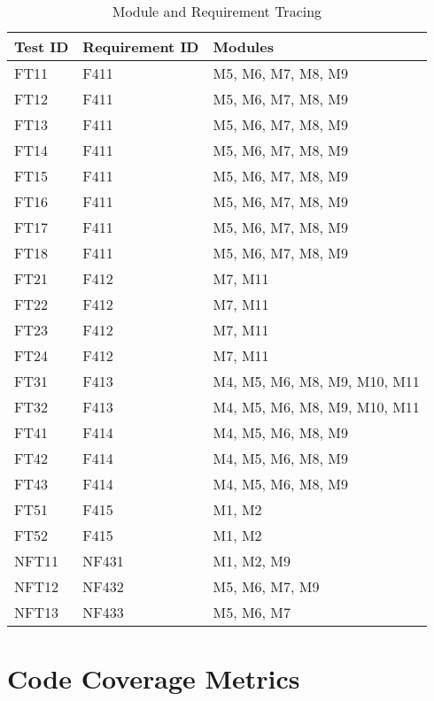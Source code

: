 \documentclass[12pt, titlepage]{article}
\begin{document}
\begin{table}[]

  \centering
  \caption{Module and Requirement Tracing}
  \begin{tabular}{|l|l|l|}
  \hline
  \textbf{Test ID} & \textbf{Requirement ID} & \textbf{Modules}\\
  \hline
  FT11 & F411 & M5, M6, M7, M8, M9\\
  \hline
  FT12 & F411 & M5, M6, M7, M8, M9\\
  \hline
  FT13 & F411 & M5, M6, M7, M8, M9\\
  \hline
  FT14 & F411 & M5, M6, M7, M8, M9\\
  \hline
  FT15 & F411 & M5, M6, M7, M8, M9\\
  \hline
  FT16 & F411 & M5, M6, M7, M8, M9\\
  \hline
  FT17 & F411 & M5, M6, M7, M8, M9\\
  \hline
  FT18 & F411 & M5, M6, M7, M8, M9\\
  \hline
  FT21 & F412 & M7, M11\\
  \hline
  FT22 & F412 & M7, M11\\
  \hline
  FT23& F412 & M7, M11\\
  \hline
  FT24 & F412 & M7, M11\\
  \hline
  FT31 & F413 & M4, M5, M6, M8, M9, M10, M11\\
  \hline
  FT32 & F413 & M4, M5, M6, M8, M9, M10, M11\\
  \hline
  FT41 & F414 & M4, M5, M6, M8, M9\\
  \hline
  FT42 & F414 & M4, M5, M6, M8, M9\\
  \hline
  FT43 & F414 & M4, M5, M6, M8, M9\\
  \hline
  FT51 & F415 & M1, M2\\
  \hline
  FT52 & F415 & M1, M2\\
  \hline
  NFT11 & NF431 & M1, M2, M9\\
  \hline
  NFT12 & NF432 & M5, M6, M7, M9\\
  \hline
  NFT13 & NF433 & M5, M6, M7\\
  \hline
  \end{tabular}
\end{table}

\section{Code Coverage Metrics}



\end{document}
